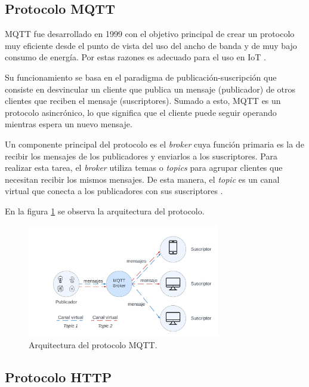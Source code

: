 \subsection{Protocolo MQTT}
\label{sec:Protocolo MQTT}

MQTT fue desarrollado en 1999 con el objetivo principal de crear un protocolo muy eficiente desde el punto de vista del uso del ancho de banda y de muy bajo consumo de energía. Por estas razones es adecuado para el uso en IoT \citep{mqtt:1}.

Su funcionamiento se basa en el paradigma de publicación-suscripción que consiste en desvincular un cliente que publica un mensaje (publicador) de otros clientes que reciben el mensaje (suscriptores). Sumado a esto, MQTT es un protocolo asincrónico, lo que significa que el cliente puede seguir operando mientras espera un nuevo mensaje.

Un componente principal del protocolo es el \textit{broker} cuya función primaria es la de recibir los mensajes de los publicadores y enviarlos a los  suscriptores. Para realizar esta tarea, el \textit{broker} utiliza temas o \textit{topics} para agrupar clientes que necesitan recibir los mismos mensajes. De esta manera, el \textit{topic} es un canal virtual que conecta a los publicadores con sus suscriptores \citep{mqtt:1}.

En la figura \ref{fig:arqmqtt} se observa la arquitectura del protocolo.
\begin{figure}[h]
	\centering
	\includegraphics[width=0.75\textwidth]{./Figures/mqtt.jpeg}
	\caption[Arquitectura del protocolo MQTT.]{Arquitectura del protocolo MQTT\protect\footnotemark.}
	\label{fig:arqmqtt}

\end{figure}



\subsection{Protocolo HTTP}
\label{sec:Protocolo HTTP}

